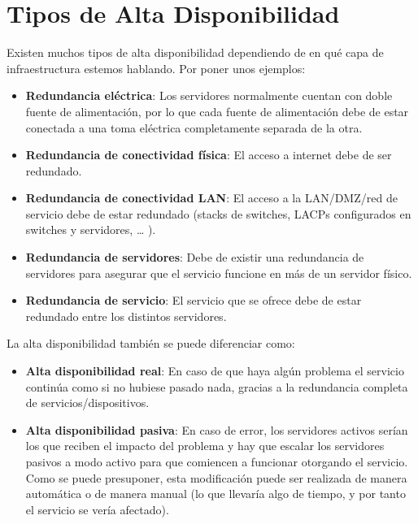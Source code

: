 \section{Tipos de Alta Disponibilidad}
Existen muchos tipos de alta disponibilidad dependiendo de en qué capa de infraestructura estemos hablando. Por poner unos ejemplos:

\begin{itemize}
    \item \textbf{Redundancia eléctrica}: Los servidores normalmente cuentan con doble fuente de alimentación, por lo que cada fuente de alimentación debe de estar conectada a una toma eléctrica completamente separada de la otra.
    \item \textbf{Redundancia de conectividad física}: El acceso a internet debe de ser redundado.
    \item \textbf{Redundancia de conectividad LAN}: El acceso a la LAN/DMZ/red de servicio debe de estar redundado (stacks de switches, LACPs configurados en switches y servidores, … ).
    \item \textbf{Redundancia de servidores}: Debe de existir una redundancia de servidores para asegurar que el servicio funcione en más de un servidor físico.
    \item \textbf{Redundancia de servicio}: El servicio que se ofrece debe de estar redundado entre los distintos servidores.
\end{itemize}


La alta disponibilidad también se puede diferenciar como:


\begin{itemize}
    \item \textbf{Alta disponibilidad real}: En caso de que haya algún problema el servicio continúa como si no hubiese pasado nada, gracias a la redundancia completa de servicios/dispositivos.
    \item \textbf{Alta disponibilidad pasiva}: En caso de error, los servidores activos serían los que reciben el impacto del problema y hay que escalar los servidores pasivos a modo activo para que comiencen a funcionar otorgando el servicio. Como se puede presuponer, esta modificación puede ser realizada de manera automática o de manera manual (lo que llevaría algo de tiempo, y por tanto el servicio se vería afectado).
\end{itemize}